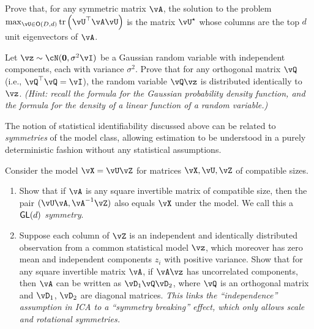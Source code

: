\documentclass[../../book-main.tex]{subfiles}
\begin{document}
\begin{exercise}\label{exercise:principal-components-derivation}
    Prove that, for any symmetric matrix \(\vA\), the solution to the problem
    \(\max_{\vU \in \O(D, d)}\tr\left(\vU^{\top}\vA\vU\right)\) is the matrix
    \(\vU^{\star}\) whose columns are the top \(d\) unit eigenvectors of \(\vA\).
\end{exercise}

\begin{exercise}\label{exercise:gaussian-rot-invar}
    Let $\vz \sim \cN(\Zero, \sigma^2 \vI)$ be a Gaussian random variable with independent components, each with variance $\sigma^2$. 
    Prove that for any orthogonal matrix $\vQ$ (i.e., $\vQ^\top \vQ = \vI$), the random variable $\vQ \vz$ is distributed identically to $\vz$. 
    \textit{(Hint: recall the formula for the Gaussian probability density function, and the formula for the density of a linear function of a random variable.) }
\end{exercise}

\begin{exercise}\label{exercise:symmetry-identifiability}
    The notion of statistical identifiability discussed above can be related to \textit{symmetries} of the model class, allowing estimation to be understood in a purely deterministic fashion without any statistical assumptions.

    Consider the model $\vX = \vU \vZ$ for matrices $\vX, \vU, \vZ$ of compatible sizes.
    \begin{enumerate}
        \item Show that if $\vA$ is any square invertible matrix of compatible size, then the pair
        $(\vU \vA, \vA^{-1} \vZ)$ also equals $\vX$ under the model. We call this a \textit{$\mathsf{GL}(d)$ symmetry}.
        \item Suppose each column of $\vZ$ is an independent and identically distributed observation from a common statistical model $\vz$, which moreover has zero mean and independent components $z_i$ with positive variance.
        Show that for any square invertible matrix $\vA$, if $\vA \vz$ has uncorrelated components, then $\vA$ can be written as $\vD_1 \vQ \vD_2$, where $\vQ$ is an orthogonal matrix and $\vD_1$, $\vD_2$ are diagonal matrices.
        \textit{This links the ``independence'' assumption in ICA to a ``symmetry breaking'' effect, which only allows scale and rotational symmetries.}
    \end{enumerate}

\end{exercise}
\end{document}
